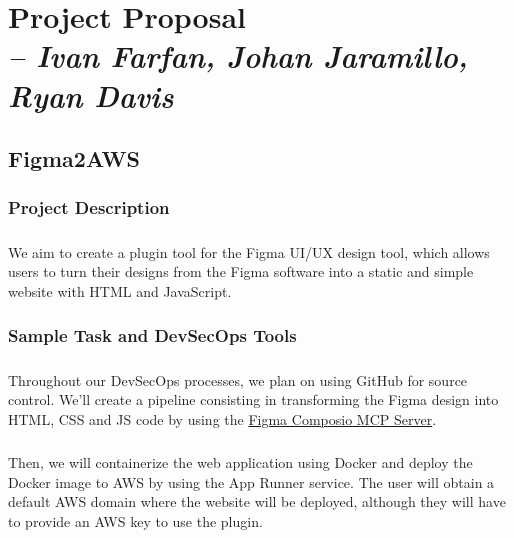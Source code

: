 \chapter{Project Proposal \\
\small{\textit{-- Ivan Farfan, Johan Jaramillo, Ryan Davis}}}
\label{chap:pproposal}

\section{Figma2AWS}

\subsection*{Project Description}
\paragraph{} We aim to create a plugin tool for the Figma UI/UX design tool, which allows users to turn their designs from the Figma software into a static and simple website with HTML and JavaScript.

\subsection*{Sample Task and DevSecOps Tools}
\paragraph{} Throughout our DevSecOps processes, we plan on using GitHub for source control. We'll create a pipeline consisting in transforming the Figma design into HTML, CSS and JS code by using the \href{https://composio.dev/blog/how-to-use-figma-mcp-with-claude-code-to-build-pixel-perfect-designs}{Figma Composio MCP Server}.  
\paragraph{} Then, we will containerize the web application using Docker and deploy the Docker image to AWS by using the App Runner service. The user will obtain a default AWS domain where the website will be deployed, although they will have to provide an AWS key to use the plugin.


